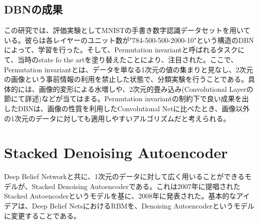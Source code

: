 \subsection{DBNの成果}
この研究では、評価実験としてMNISTの手書き数字認識データセットを用いている。彼らは各レイヤーのユニット数が"784-500-500-2000-10"という構造のDBNによって、学習を行った。そして、Permutation invariantと呼ばれるタスクにて、当時のstate fo the artを塗り替えたことにより、注目された。ここで、Permutation invariantとは、データを単なる1次元の値の集まりと見なし、2次元の画像という事前情報の利用を禁止した状態で、分類実験を行うことである。具体的には、画像的変形による水増しや、2次元的畳み込み(Convolutional Layerの節にて詳述)などが当てはまる。Permutation invariantの制約下で良い成果を出したDBNは、画像の性質を利用したConvolutional Netに比べたとき、画像以外の1次元のデータに対しても適用しやすいアルゴリズムだと考えられる。

\section{Stacked Denoising Autoencoder}
Deep Belief Networkと共に、1次元のデータに対して広く用いることができるモデルが、Stacked Denoising Autoencoderである。これは2007年に提唱されたStacked Autoencoder\cite{bengio2007greedy}というモデルを基に、2008年に発表された\cite{VincentPLarochelleH2008}。基本的なアイデアは、Deep Belief NetsにおけるRBMを、Denoising Autoencoderというモデルに変更することである。

